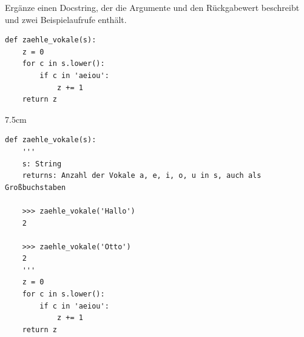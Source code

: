 \question[3]
Ergänze einen Docstring, der die Argumente und den Rückgabewert beschreibt und zwei Beispielaufrufe enthält.
\begin{lstlisting}
def zaehle_vokale(s):
    z = 0
    for c in s.lower():
        if c in 'aeiou':
            z += 1
    return z
\end{lstlisting}
\begin{solutionbox}{7.5cm}
\begin{lstlisting}
def zaehle_vokale(s):
    '''
    s: String
    returns: Anzahl der Vokale a, e, i, o, u in s, auch als Großbuchstaben

    >>> zaehle_vokale('Hallo')
    2

    >>> zaehle_vokale('Otto')
    2
    '''
    z = 0
    for c in s.lower():
        if c in 'aeiou':
            z += 1
    return z
\end{lstlisting}
\end{solutionbox}
